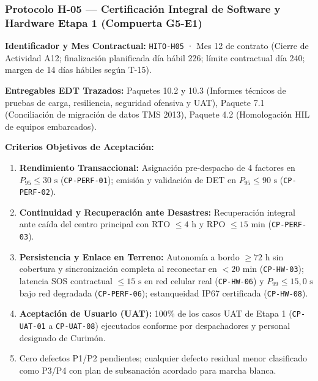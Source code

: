 \subsubsection*{Protocolo H-05 — Certificación Integral de Software y Hardware Etapa 1 (Compuerta G5-E1)}\label{sec:9-proto-h5}
\par\noindent\textbf{Identificador y Mes Contractual:} \texttt{HITO-H05} · Mes 12 de contrato (Cierre de Actividad A12; finalización planificada día hábil 226; límite contractual día 240; margen de 14 días hábiles según T-15).\par
\par\noindent\textbf{Entregables EDT Trazados:} Paquetes 10.2 y 10.3 (Informes técnicos de pruebas de carga, resiliencia, seguridad ofensiva y UAT), Paquete 7.1 (Conciliación de migración de datos TMS 2013), Paquete 4.2 (Homologación HIL de equipos embarcados).\par
\par\noindent\textbf{Criterios Objetivos de Aceptación:}
\begin{enumerate}
  \item \textbf{Rendimiento Transaccional:} Asignación pre-despacho de 4 factores en $P_{95} \le 30\text{ s}$ (\texttt{CP-PERF-01}); emisión y validación de DET en $P_{95} \le 90\text{ s}$ (\texttt{CP-PERF-02}).
  \item \textbf{Continuidad y Recuperación ante Desastres:} Recuperación integral ante caída del centro principal con RTO $\le 4\text{ h}$ y RPO $\le 15\text{ min}$ (\texttt{CP-PERF-03}).
  \item \textbf{Persistencia y Enlace en Terreno:} Autonomía a bordo $\ge 72\text{ h}$ sin cobertura y sincronización completa al reconectar en $< 20\text{ min}$ (\texttt{CP-HW-03}); latencia SOS contractual $\le 15\text{ s}$ en red celular real (\texttt{CP-HW-06}) y $P_{99} \le 15{,}0\text{ s}$ bajo red degradada (\texttt{CP-PERF-06}); estanqueidad IP67 certificada (\texttt{CP-HW-08}).
  \item \textbf{Aceptación de Usuario (UAT):} 100\% de los casos UAT de Etapa 1 (\texttt{CP-UAT-01} a \texttt{CP-UAT-08}) ejecutados conforme por despachadores y personal designado de Curimón.
  \item Cero defectos P1/P2 pendientes; cualquier defecto residual menor clasificado como P3/P4 con plan de subsanación acordado para marcha blanca.
\end{enumerate}
